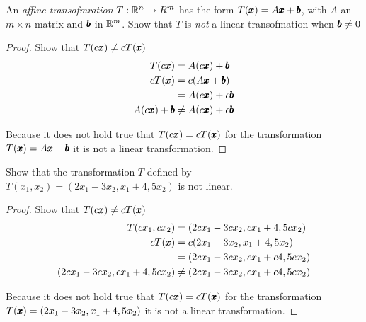 \documentclass{../mathhomework}
\begin{document}
\begin{problem}[1.8\#30]
    An \textit{affine transofmration} $T: \mathbb{R}^n \to R^m$ has the form $T(\pmb{x}) = A\pmb{x} + \pmb{b}$, with $A$ an $m \times n$ matrix and $\pmb{b}$ in $\mathbb{R}^m$.
    Show that $T$ is \textit{not} a linear transofmation when $\pmb{b} \neq 0$ 

    \begin{solution}
        \begin{proof}
            Show that $T(c\pmb{x}) \neq cT(\pmb{x})$
            \begin{align}
                T(c\pmb{x}) & = A(c\pmb{x}) + \pmb{b} \\
                cT(\pmb{x}) & = c(A\pmb{x} + \pmb{b}) \\
                    & = A(c\pmb{x}) + c\pmb{b} \\
                A(c\pmb{x}) + \pmb{b} &\neq A(c\pmb{x}) + c\pmb{b}
            \end{align}

            Because it does not hold true that $T(c\pmb{x}) = cT(\pmb{x})$ for the transformation $T(\pmb{x}) = A\pmb{x} + \pmb{b}$ it is not a linear transformation.
        \end{proof}
    \end{solution}
\end{problem}

\begin{problem}[1.8\#33]
    Show that the transformation $T$ defined by $T(x_1,x_2) = (2x_1 - 3x_2, x_1 + 4, 5x_2)$ is not linear.

    \begin{solution}
        \begin{proof}
            Show that $T(c\pmb{x}) \neq cT(\pmb{x})$
            \begin{align}
                T(cx_1,cx_2) & = (2cx_1 - 3cx_2, cx_1 + 4, 5cx_2)\\
                cT(\pmb{x}) & = c(2x_1 - 3x_2, x_1 + 4, 5x_2) \\
                    & = (2cx_1 - 3cx_2, cx_1 + c4, 5cx_2) \\
                (2cx_1 - 3cx_2, cx_1 + 4, 5cx_2) &\neq (2cx_1 - 3cx_2, cx_1 + c4, 5cx_2) 
            \end{align}

            Because it does not hold true that $T(c\pmb{x}) = cT(\pmb{x})$ for the transformation $T(\pmb{x}) = (2x_1 - 3x_2, x_1 + 4, 5x_2)$ it is not a linear transformation.
        \end{proof}
    \end{solution}
\end{problem}
\end{document}
